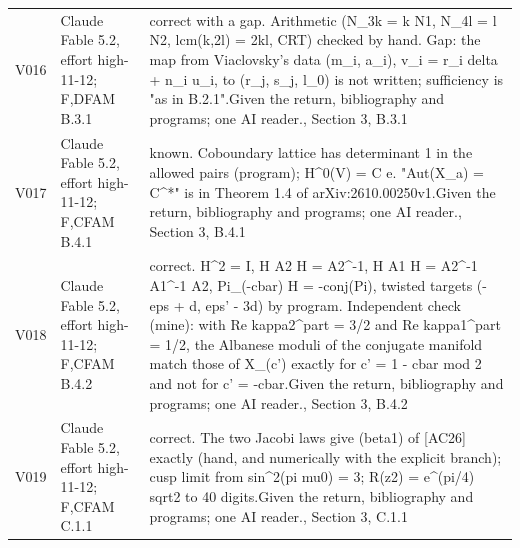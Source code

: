 \documentclass[11pt,a4paper]{article}
\theoremstyle{plain}
\theoremstyle{definition}
\begin{document}
\begin{longtable}{@{}L{.08\linewidth}L{.31\linewidth}L{.56\linewidth}@{}}
V016 & Claude Fable 5.2, effort high-11-12; F,D\newline FAM B.3.1 & correct with a gap. Arithmetic (N\_\allowbreak{}3k = k N1, N\_\allowbreak{}4l = l N2, lcm(k,2l) = 2kl, CRT) checked by hand. Gap:\allowbreak{} the map from Viaclovsky's data (m\_\allowbreak{}i, a\_\allowbreak{}i), v\_\allowbreak{}i = r\_\allowbreak{}i delta + n\_\allowbreak{}i u\_\allowbreak{}i, to (r\_\allowbreak{}j, s\_\allowbreak{}j, l\_\allowbreak{}0) is not written; sufficiency is "as in B.2.1".\newline Given the return, bibliography and programs; one AI reader.\newline {}, Section 3, B.3.1\\
V017 & Claude Fable 5.2, effort high-11-12; F,C\newline FAM B.4.1 & known. Coboundary lattice has determinant 1 in the allowed pairs (program); H\textasciicircum{}0(V) = C e. "Aut(X\_\allowbreak{}a) = C\textasciicircum{}*" is in Theorem 1.4 of arXiv:\allowbreak{}2610.00250v1.\newline Given the return, bibliography and programs; one AI reader.\newline {}, Section 3, B.4.1\\
V018 & Claude Fable 5.2, effort high-11-12; F,C\newline FAM B.4.2 & correct. H\textasciicircum{}2 = I, H A2 H = A2\textasciicircum{}-1, H A1 H = A2\textasciicircum{}-1 A1\textasciicircum{}-1 A2, Pi\_\allowbreak{}(-cbar) H = -conj(Pi), twisted targets (-eps + d, eps' - 3d) by program. Independent check (mine):\allowbreak{} with Re kappa2\textasciicircum{}part = 3/\allowbreak{}2 and Re kappa1\textasciicircum{}part = 1/\allowbreak{}2, the Albanese moduli of the conjugate manifold match those of X\_\allowbreak{}(c') exactly for c' = 1 - cbar mod 2 and not for c' = -cbar.\newline Given the return, bibliography and programs; one AI reader.\newline {}, Section 3, B.4.2\\
V019 & Claude Fable 5.2, effort high-11-12; F,C\newline FAM C.1.1 & correct. The two Jacobi laws give (beta1) of [AC26] exactly (hand, and numerically with the explicit branch); cusp limit from sin\textasciicircum{}2(pi mu0) = 3; R(z2) = e\textasciicircum{}(pi/\allowbreak{}4) sqrt2 to 40 digits.\newline Given the return, bibliography and programs; one AI reader.\newline {}, Section 3, C.1.1\\

\end{longtable}
\end{document}
